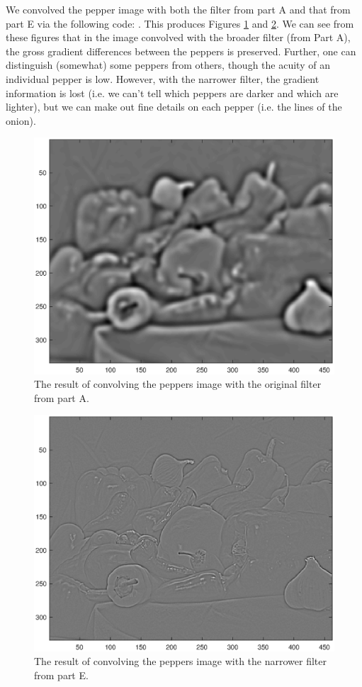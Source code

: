 \documentclass[11pt, oneside]{article}
\begin{document}
We convolved the pepper image with both the filter from part A and that from part E via the following code:
.
This produces Figures \ref{fig:pepper_broad} and \ref{fig:pepper_narrow}. We can see from these figures that in the image convolved with the broader filter (from Part A), the gross gradient differences between the peppers is preserved. Further, one can distinguish (somewhat) some peppers from others, though the acuity of an individual pepper is low. However, with the narrower filter, the gradient information is lost (i.e. we can't tell which peppers are darker and which are lighter), but we can make out fine details on each pepper (i.e. the lines of the onion).

\begin{figure}[ht!]
\includegraphics[width=1\textwidth]{peppers_dog_conv.eps}
\caption{The result of convolving the peppers image with the original filter from part A.}
\label{fig:pepper_broad}
\end{figure}

\begin{figure}[ht!]
\includegraphics[width=1\textwidth]{peppers_dog3_conv.eps}
\caption{The result of convolving the peppers image with the narrower filter from part E.}
\label{fig:pepper_narrow}
\end{figure}
\end{document}
